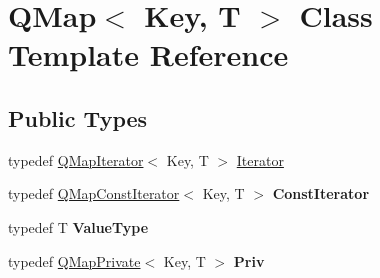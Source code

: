 \hypertarget{class_q_map}{}\section{Q\+Map$<$ Key, T $>$ Class Template Reference}
\label{class_q_map}
\subsection*{Public Types}
\begin{DoxyCompactItemize}
\item 
typedef \mbox{\hyperlink{class_q_map_iterator}{Q\+Map\+Iterator}}$<$ Key, T $>$ \mbox{\hyperlink{class_q_map_aa920e1d34440b34269b350ab96bd73d0}{Iterator}}
\item 
\mbox{\label{class_q_map_afa9389e1d78c9571f1353fdbf0b267b4}} 
typedef \mbox{\hyperlink{class_q_map_const_iterator}{Q\+Map\+Const\+Iterator}}$<$ Key, T $>$ {\bfseries Const\+Iterator}
\item 
\mbox{\label{class_q_map_a207394e4bdb1d29a8a456991953cc42b}} 
typedef T {\bfseries Value\+Type}
\item 
\mbox{\label{class_q_map_af63078f1afbbec29ac319ddbd88aefdd}} 
typedef \mbox{\hyperlink{class_q_map_private}{Q\+Map\+Private}}$<$ Key, T $>$ {\bfseries Priv}
\end{DoxyCompactItemize}
